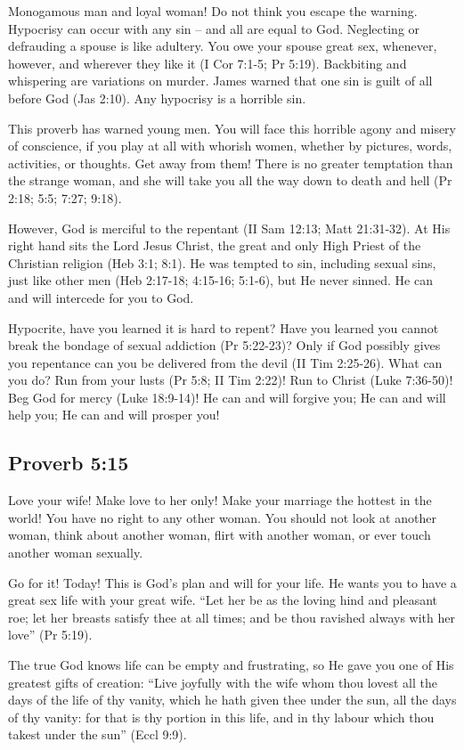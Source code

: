 Monogamous man and loyal woman! Do not think you escape the warning. Hypocrisy can occur with any sin – and all are equal to God. Neglecting or defrauding a spouse is like adultery. You owe your spouse great sex, whenever, however, and wherever they like it (I Cor 7:1-5; Pr 5:19). Backbiting and whispering are variations on murder. James warned that one sin is guilt of all before God (Jas 2:10). Any hypocrisy is a horrible sin.

This proverb has warned young men. You will face this horrible agony and misery of conscience, if you play at all with whorish women, whether by pictures, words, activities, or thoughts. Get away from them! There is no greater temptation than the strange woman, and she will take you all the way down to death and hell (Pr 2:18; 5:5; 7:27; 9:18).

However, God is merciful to the repentant (II Sam 12:13; Matt 21:31-32). At His right hand sits the Lord Jesus Christ, the great and only High Priest of the Christian religion (Heb 3:1; 8:1). He was tempted to sin, including sexual sins, just like other men (Heb 2:17-18; 4:15-16; 5:1-6), but He never sinned. He can and will intercede for you to God.

Hypocrite, have you learned it is hard to repent? Have you learned you cannot break the bondage of sexual addiction (Pr 5:22-23)? Only if God possibly gives you repentance can you be delivered from the devil (II Tim 2:25-26). What can you do? Run from your lusts (Pr 5:8; II Tim 2:22)! Run to Christ (Luke 7:36-50)! Beg God for mercy (Luke 18:9-14)! He can and will forgive you; He can and will help you; He can and will prosper you!

\subsection{Proverb 5:15}
Love your wife! Make love to her only! Make your marriage the hottest in the world! You have no right to any other woman. You should not look at another woman, think about another woman, flirt with another woman, or ever touch another woman sexually.

Go for it! Today! This is God’s plan and will for your life. He wants you to have a great sex life with your great wife. “Let her be as the loving hind and pleasant roe; let her breasts satisfy thee at all times; and be thou ravished always with her love” (Pr 5:19).

The true God knows life can be empty and frustrating, so He gave you one of His greatest gifts of creation: “Live joyfully with the wife whom thou lovest all the days of the life of thy vanity, which he hath given thee under the sun, all the days of thy vanity: for that is thy portion in this life, and in thy labour which thou takest under the sun” (Eccl 9:9).

